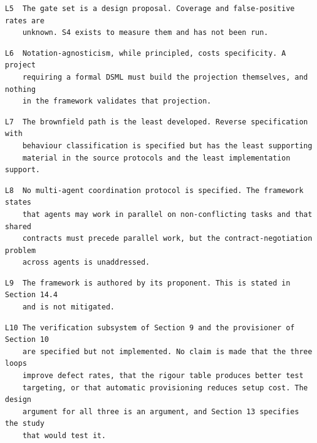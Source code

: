 \documentclass[11pt,a4paper]{article}
\begin{document}
\begin{Verbatim}[fontsize=\footnotesize,breaklines=true,breakanywhere=true,breakautoindent=false,samepage=false]
L5  The gate set is a design proposal. Coverage and false-positive rates are
    unknown. S4 exists to measure them and has not been run.
\end{Verbatim}

\begin{Verbatim}[fontsize=\footnotesize,breaklines=true,breakanywhere=true,breakautoindent=false,samepage=false]
L6  Notation-agnosticism, while principled, costs specificity. A project
    requiring a formal DSML must build the projection themselves, and nothing
    in the framework validates that projection.
\end{Verbatim}

\begin{Verbatim}[fontsize=\footnotesize,breaklines=true,breakanywhere=true,breakautoindent=false,samepage=false]
L7  The brownfield path is the least developed. Reverse specification with
    behaviour classification is specified but has the least supporting
    material in the source protocols and the least implementation support.
\end{Verbatim}

\begin{Verbatim}[fontsize=\footnotesize,breaklines=true,breakanywhere=true,breakautoindent=false,samepage=false]
L8  No multi-agent coordination protocol is specified. The framework states
    that agents may work in parallel on non-conflicting tasks and that shared
    contracts must precede parallel work, but the contract-negotiation problem
    across agents is unaddressed.
\end{Verbatim}

\begin{Verbatim}[fontsize=\footnotesize,breaklines=true,breakanywhere=true,breakautoindent=false,samepage=false]
L9  The framework is authored by its proponent. This is stated in Section 14.4
    and is not mitigated.
\end{Verbatim}

\begin{Verbatim}[fontsize=\footnotesize,breaklines=true,breakanywhere=true,breakautoindent=false,samepage=false]
L10 The verification subsystem of Section 9 and the provisioner of Section 10
    are specified but not implemented. No claim is made that the three loops
    improve defect rates, that the rigour table produces better test
    targeting, or that automatic provisioning reduces setup cost. The design
    argument for all three is an argument, and Section 13 specifies the study
    that would test it.
\end{Verbatim}
\end{document}
